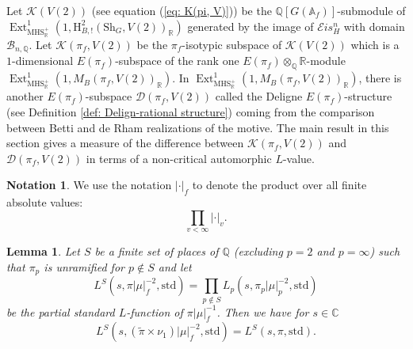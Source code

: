 \documentclass[11pt, a4paper]{amsart}
\theoremstyle{plain}
\newtheorem{lemma}[theorem]{Lemma}
\theoremstyle{definition}
\newtheorem{notation}[theorem]{Notation}
\numberwithin{equation}{section}
\def\AAA{\mathbb{A}}
\def\CC{\mathbb{C}}
\def\QQ{\mathbb{Q}}
\def\RR{\mathbb{R}}
\DeclareMathOperator{\Ext}{Ext}
\newcommand{\Sh}{\mathrm{Sh}}
\begin{document}
\par Let $\mathcal{K}(V(2))$ (see equation (\ref{eq: K(pi, V)})) be the $\QQ[G(\AAA_f)]$-submodule of $\Ext^{1}_{\mathrm{MHS}_{\RR}^{+}}(1, \mathrm{H}^{2}_{B,!}(\Sh_G,V(2))_{\RR})$ generated by   the image of $\mathcal{E}is^{n}_H$ with domain $\mathcal{B}_{n, \QQ}$. Let $\mathcal{K}(\pi_f, V(2))$ be the $\pi_f$-isotypic subspace of $\mathcal{K}(V(2))$ which is a $1$-dimensional $E(\pi_f)$-subspace of the rank one $E(\pi_f)\otimes_{\QQ}\RR$-module $\Ext^{1}_{\mathrm{MHS}_{\RR}^{+}}(1, M_{B}(\pi_f, V(2))_{\RR})$. In $\Ext^{1}_{\mathrm{MHS}_{\RR}^{+}}(1, M_{B}(\pi_f, V(2))_{\RR})$, there is another $E(\pi_f)$-subspace $\mathcal{D}(\pi_f, V(2))$ called the Deligne $E(\pi_f)$-structure (see Definition \ref{def: Delign-rational structure}) coming from the comparison between Betti and de Rham realizations of the motive. The main result in this section gives a measure of the difference between $\mathcal{K}(\pi_f,V(2))$ and $\mathcal{D}(\pi_f,V(2))$ in terms of a non-critical automorphic $L$-value. 

\begin{notation}
    We use the notation $|\cdot|_{f}$ to denote the product over all finite absolute values:
    \begin{equation*}
        \prod_{v < \infty} |\cdot|_{v}. 
    \end{equation*}
\end{notation}

\begin{lemma}
\label{Lemma: relate L-function of contra of pi to L-function of pi}
    Let $S$ be a finite set of places of $\QQ$ (excluding $p = 2$ and $p = \infty$) such that $\pi_{p}$ is unramified for $p \notin S$ and let 
    \begin{equation*}
            L^{S}(s, \pi |\mu|_{f}^{-2}, \mathrm{std}) = \prod_{p \notin S} L_{p}(s, \pi_p |\mu|_{p}^{-2}, \mathrm{std})
    \end{equation*}
    be the partial standard $L$-function of $\pi|\mu|_{f}^{-1}$. Then we have for $s \in \CC$
    \begin{equation*}
            L^{S}(s, (\tilde{\pi} \times \nu_1 )|\mu|_{f}^{-2}, \mathrm{std}) = L^{S}(s, \pi, \mathrm{std}). 
    \end{equation*}
\end{lemma}
\end{document}
